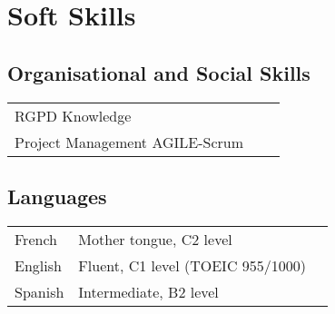 \documentclass[9pt]{article}
\begin{document}
    \section*{Soft Skills}
    \begin{minipage}[ht]{0.48\textwidth}
        \subsection*{Organisational and Social Skills}
        \begin{tabular}{lll}
            RGPD Knowledge\\
            Project Management AGILE-Scrum\\
        \end{tabular}
    \end{minipage}
    \begin{minipage}[ht]{0.48\textwidth}
        \subsection*{Languages}
        \begin{tabular}{lll}
            French&Mother tongue, C2 level\\
            English& Fluent, C1 level (TOEIC 955/1000)\\
            Spanish& Intermediate, B2 level\\
        \end{tabular}
    \end{minipage}
\end{document}
